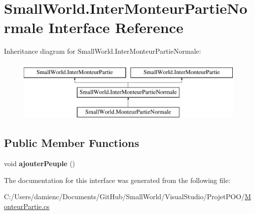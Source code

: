 \hypertarget{interface_small_world_1_1_inter_monteur_partie_normale}{\section{Small\-World.\-Inter\-Monteur\-Partie\-Normale Interface Reference}
\label{interface_small_world_1_1_inter_monteur_partie_normale}
}
Inheritance diagram for Small\-World.\-Inter\-Monteur\-Partie\-Normale\-:\begin{figure}[H]
\begin{center}
\leavevmode
\includegraphics[height=3.000000cm]{interface_small_world_1_1_inter_monteur_partie_normale}
\end{center}
\end{figure}
\subsection*{Public Member Functions}
\begin{DoxyCompactItemize}
\item 
\hypertarget{interface_small_world_1_1_inter_monteur_partie_normale_a4616843a525be26a4d55e3928f21ef3d}{void {\bfseries ajouter\-Peuple} ()}\label{interface_small_world_1_1_inter_monteur_partie_normale_a4616843a525be26a4d55e3928f21ef3d}

\end{DoxyCompactItemize}


The documentation for this interface was generated from the following file\-:\begin{DoxyCompactItemize}
\item 
C\-:/\-Users/damienc/\-Documents/\-Git\-Hub/\-Small\-World/\-Visual\-Studio/\-Projet\-P\-O\-O/\hyperlink{_monteur_partie_8cs}{Monteur\-Partie.\-cs}\end{DoxyCompactItemize}
